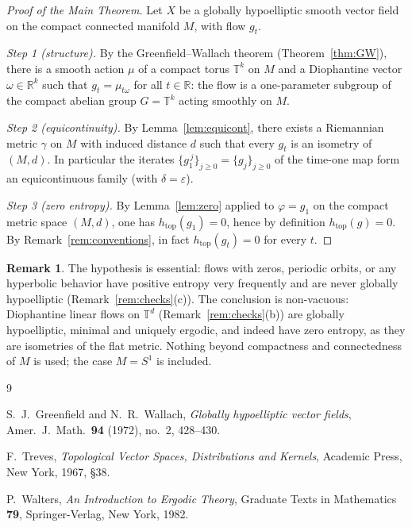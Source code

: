 \documentclass[11pt]{article}
\theoremstyle{definition}
\newtheorem{remark}[theorem]{Remark}
\newcommand{\TT}{\mathbb{T}}
\newcommand{\RR}{\mathbb{R}}
\begin{document}
\begin{proof}[Proof of the Main Theorem]
Let $X$ be a globally hypoelliptic smooth vector field on the compact
connected manifold $M$, with flow $g_t$.

\smallskip
\noindent\emph{Step 1 (structure).}
By the Greenfield--Wallach theorem (Theorem~\ref{thm:GW}), there is a
smooth action $\mu$ of a compact torus $\TT^k$ on $M$ and a Diophantine
vector $\omega \in \RR^k$ such that $g_t = \mu_{t\omega}$ for all
$t \in \RR$: the flow is a one-parameter subgroup of the compact abelian
group $G = \TT^k$ acting smoothly on $M$.

\smallskip
\noindent\emph{Step 2 (equicontinuity).}
By Lemma~\ref{lem:equicont}, there exists a Riemannian metric $\gamma$ on
$M$ with induced distance $d$ such that every $g_t$ is an isometry of
$(M,d)$. In particular the iterates $\{g_1^{\,j}\}_{j \ge 0} =
\{g_j\}_{j \ge 0}$ of the time-one map form an equicontinuous family
(with $\delta = \varepsilon$).

\smallskip
\noindent\emph{Step 3 (zero entropy).}
By Lemma~\ref{lem:zero} applied to $\varphi = g_1$ on the compact metric
space $(M,d)$, one has $h_{\mathrm{top}}(g_1) = 0$, hence by definition
$h_{\mathrm{top}}(g) = 0$. By Remark~\ref{rem:conventions}, in fact
$h_{\mathrm{top}}(g_t) = 0$ for every $t$.
\end{proof}

\begin{remark}
The hypothesis is essential: flows with zeros, periodic orbits, or any
hyperbolic behavior have positive entropy very frequently and are never
globally hypoelliptic (Remark~\ref{rem:checks}(c)). The conclusion is
non-vacuous: Diophantine linear flows on $\TT^d$
(Remark~\ref{rem:checks}(b)) are globally hypoelliptic, minimal and
uniquely ergodic, and indeed have zero entropy, as they are isometries of
the flat metric. Nothing beyond compactness and connectedness of $M$ is
used; the case $M = S^1$ is included.
\end{remark}

\begin{thebibliography}{9}

S.~J.~Greenfield and N.~R.~Wallach,
\emph{Globally hypoelliptic vector fields},
Amer.~J.~Math.~\textbf{94} (1972), no.~2, 428--430.

F.~Treves,
\emph{Topological Vector Spaces, Distributions and Kernels},
Academic Press, New York, 1967, \S38.

P.~Walters,
\emph{An Introduction to Ergodic Theory},
Graduate Texts in Mathematics \textbf{79}, Springer-Verlag, New York,
1982.

\end{thebibliography}
\end{document}
